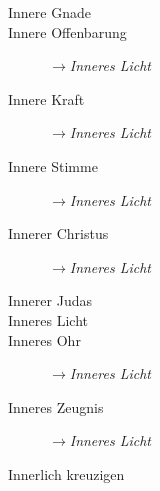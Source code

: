 \begin{description}
 \item[Innere Gnade]
 
 \item[Innere Offenbarung] $\to$\textit{Inneres Licht}
 \item[Innere Kraft] $\to$\textit{Inneres Licht}
 \item[Innere Stimme] $\to$\textit{Inneres Licht}
 \item[Innerer Christus] $\to$\textit{Inneres Licht}
 \item[Innerer Judas]
 \item[Inneres Licht]
 \item[Inneres Ohr] $\to$\textit{Inneres Licht}
 \item[Inneres Zeugnis] $\to$\textit{Inneres Licht}
 \item[Innerlich kreuzigen]
 \end{description}

\normalsize